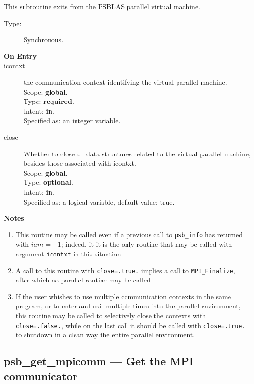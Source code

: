 This subroutine exits from the  PSBLAS parallel virtual  machine.
\begin{description}
\item[Type:] Synchronous.
\item[\bf  On Entry ]
\item[icontxt] the communication context identifying the virtual
  parallel machine.\\
Scope: {\bf global}.\\
Type: {\bf required}.\\
Intent: {\bf in}.\\
Specified as: an integer variable.
\item[close] Whether to close all data structures related to the
  virtual parallel machine, besides those associated with icontxt.\\
Scope: {\bf global}.\\
Type: {\bf optional}.\\
Intent: {\bf in}.\\
Specified as: a logical  variable, default value: true.
\end{description}

{\par\noindent\large\bfseries Notes}
\begin{enumerate}
\item This routine may be called even if a previous call to
  \verb|psb_info| has returned with $iam=-1$; indeed, it it is the only
  routine that may be called with argument \verb|icontxt| in this
  situation.
\item A call to this routine with \verb|close=.true.| implies a call
  to \verb|MPI_Finalize|, after which no parallel routine may be called.
\item If the user whishes to use multiple communication contexts in the
  same program, or to enter and exit multiple times into the parallel
  environment, this routine may be called to 
  selectively close the contexts with \verb|close=.false.|, while on
  the last call it should be called with \verb|close=.true.| to
  shutdown in a clean way the entire parallel environment.
\end{enumerate}


\clearpage\subsection*{psb\_get\_mpicomm --- Get the MPI communicator}

